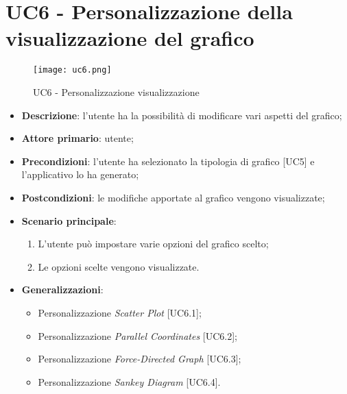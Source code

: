 \section{UC6 - Personalizzazione della visualizzazione del grafico}
\begin{figure}[H]
  \centering
  \texttt{[image: uc6.png]}
  \caption{UC6 - Personalizzazione visualizzazione}
\end{figure}

\begin{itemize}
  \item \textbf{Descrizione}: l'utente ha la possibilità di modificare vari aspetti del grafico;
  \item \textbf{Attore primario}: utente;
  \item \textbf{Precondizioni}: l'utente ha selezionato la tipologia di grafico [UC5] e l'applicativo lo ha generato;
  \item \textbf{Postcondizioni}: le modifiche apportate al grafico vengono visualizzate;
  \item \textbf{Scenario principale}:
   \begin{enumerate}
    \item L'utente può impostare varie opzioni del grafico scelto;
    \item Le opzioni scelte vengono visualizzate.
  \end{enumerate}
  \item \textbf{Generalizzazioni}:
    \begin{itemize}
      \item Personalizzazione \textit{Scatter Plot} [UC6.1];
      \item Personalizzazione \textit{Parallel Coordinates} [UC6.2];
      \item Personalizzazione \textit{Force-Directed Graph} [UC6.3];
      \item Personalizzazione \textit{Sankey Diagram} [UC6.4].
    \end{itemize}
\end{itemize}

